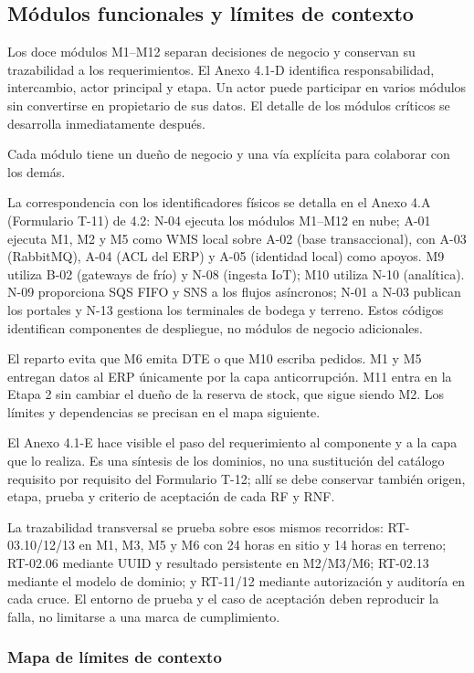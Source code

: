 \subsection{Módulos funcionales y límites de contexto}
\label{sec:modulos-funcionales}

Los doce módulos M1--M12 separan decisiones de negocio y conservan su trazabilidad a los requerimientos. El Anexo 4.1-D identifica responsabilidad, intercambio, actor principal y etapa. Un actor puede participar en varios módulos sin convertirse en propietario de sus datos. El detalle de los módulos críticos se desarrolla inmediatamente después.


Cada módulo tiene un dueño de negocio y una vía explícita para colaborar con los demás.

La correspondencia con los identificadores físicos se detalla en el Anexo 4.A (Formulario T-11) de 4.2: N-04 ejecuta los módulos M1--M12 en nube; A-01 ejecuta M1, M2 y M5 como WMS local sobre A-02 (base transaccional), con A-03 (RabbitMQ), A-04 (ACL del ERP) y A-05 (identidad local) como apoyos. M9 utiliza B-02 (gateways de frío) y N-08 (ingesta IoT); M10 utiliza N-10 (analítica). N-09 proporciona SQS FIFO y SNS a los flujos asíncronos; N-01 a N-03 publican los portales y N-13 gestiona los terminales de bodega y terreno. Estos códigos identifican componentes de despliegue, no módulos de negocio adicionales.

El reparto evita que M6 emita DTE o que M10 escriba pedidos. M1 y M5 entregan datos al ERP únicamente por la capa anticorrupción. M11 entra en la Etapa 2 sin cambiar el dueño de la reserva de stock, que sigue siendo M2. Los límites y dependencias se precisan en el mapa siguiente.

El Anexo 4.1-E hace visible el paso del requerimiento al componente y a la capa que lo realiza. Es una síntesis de los dominios, no una sustitución del catálogo requisito por requisito del Formulario T-12; allí se debe conservar también origen, etapa, prueba y criterio de aceptación de cada RF y RNF.


La trazabilidad transversal se prueba sobre esos mismos recorridos: RT-03.10/12/13 en M1, M3, M5 y M6 con 24 horas en sitio y 14 horas en terreno; RT-02.06 mediante UUID y resultado persistente en M2/M3/M6; RT-02.13 mediante el modelo de dominio; y RT-11/12 mediante autorización y auditoría en cada cruce. El entorno de prueba y el caso de aceptación deben reproducir la falla, no limitarse a una marca de cumplimiento.

\subsubsection{Mapa de límites de contexto}
\label{subsec:limites-contexto}

